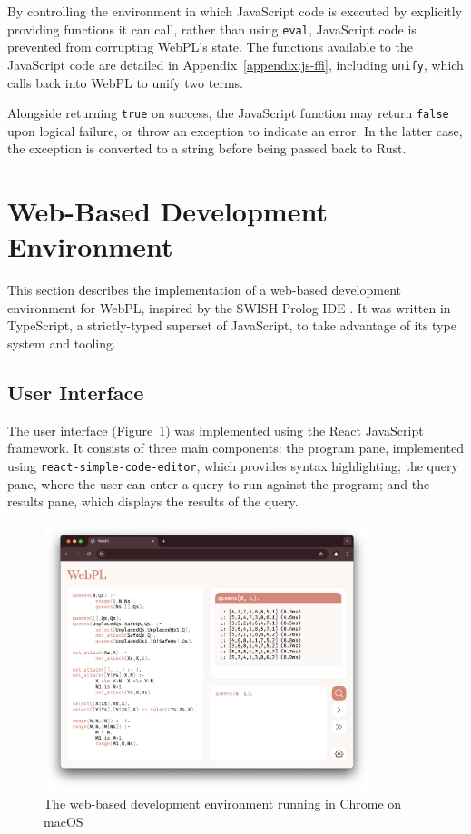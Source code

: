 By controlling the environment in which JavaScript code is executed by explicitly providing functions it can call, rather than using \texttt{eval}, JavaScript code is prevented from corrupting WebPL's state. The functions available to the JavaScript code are detailed in Appendix~\ref{appendix:js-ffi}, including \texttt{unify}, which calls back into WebPL to unify two terms.

Alongside returning \texttt{true} on success, the JavaScript function may return \texttt{false} upon logical failure, or throw an exception to indicate an error. In the latter case, the exception is converted to a string before being passed back to Rust.

\section{Web-Based Development Environment}

\label{sec:web-dev-env}

This section describes the implementation of a web-based development environment for WebPL, inspired by the SWISH Prolog IDE \cite{wielemakerSWISHSWIPrologSharing2015}. It was written in TypeScript, a strictly-typed superset of JavaScript, to take advantage of its type system and tooling.

\subsection{User Interface}

The user interface (Figure~\ref{fig:webpl}) was implemented using the React JavaScript framework. It consists of three main components: the program pane, implemented using \texttt{react-simple-code-editor}, which provides syntax highlighting; the query pane, where the user can enter a query to run against the program; and the results pane, which displays the results of the query.

\begin{figure}[H]
\centering
\includegraphics[width=0.85\textwidth]{07implementation_browser.png}
\caption{The web-based development environment running in Chrome on macOS}
\label{fig:webpl}
\end{figure}

